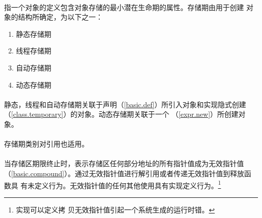 \paragraph{} %
指一个对象的定义包含对象存储的最小潜在生命期的属性。存储期由用于创建
对象的结构所确定，为以下之一：
\begin{enumerate}
  \item 静态存储期
  \item 线程存储期
  \item 自动存储期
  \item 动态存储期
\end{enumerate}

\paragraph{} %
静态，线程和自动存储期关联于声明（\ref{basic.def}）所引入对象和实现隐式创建
（\ref{class.temporary}）的对象。动态存储期关联于一个
（\ref{expr.new}）所创建对象。

\paragraph{} %
存储期类别对引用也适用。

\paragraph{} %
当存储区期限终止时，表示存储区任何部分地址的所有指针值成为无效指针值
（\ref{basic.compound}）。通过无效指针值进行解引用或者传递无效指针值到释放函数具
有未定义行为。无效指针值的任何其他使用具有实现定义行为。\footnote{实现可以定义拷
贝无效指针值引起一个系统生成的运行时错。}
